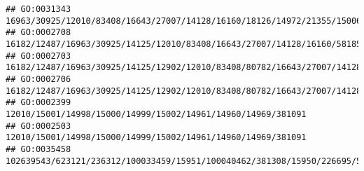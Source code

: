 \documentclass[
]{article}
\begin{document}
\begin{verbatim}
## GO:0031343                                                                                                                                                                                                                                                       16963/30925/12010/83408/16643/27007/14128/16160/18126/14972/21355/15006/15013/15015/110557/15018/68395/110558/15039/100529082/15024/667977/14990/20400
## GO:0002708                                                                                                                                                                                                                         16182/12487/16963/30925/14125/12010/83408/16643/27007/14128/16160/58185/14972/21355/15006/15013/15015/110557/15018/68395/110558/15039/100529082/15024/667977/14990/20371/20400/12229
## GO:0002703                                                                                                                                                           16182/12487/16963/30925/14125/12902/12010/83408/80782/16643/27007/14128/69550/81897/215900/16160/327957/58185/13421/14972/21354/21355/15006/15013/15015/110557/15018/68395/110558/15039/100529082/15024/667977/14990/14126/60533/20371/20400/12229
## GO:0002706                                                                                                                                                                                          16182/12487/16963/30925/14125/12902/12010/83408/80782/16643/27007/14128/215900/16160/58185/14972/21354/21355/15006/15013/15015/110557/15018/68395/110558/15039/100529082/15024/667977/14990/60533/20371/20400/12229
## GO:0002399                                                                                                                                                                                                                                                                                                                                                 12010/15001/14998/15000/14999/15002/14961/14960/14969/381091
## GO:0002503                                                                                                                                                                                                                                                                                                                                                 12010/15001/14998/15000/14999/15002/14961/14960/14969/381091
## GO:0035458                                                                                                                                                                                                                                                                          102639543/623121/236312/100033459/15951/100040462/381308/15950/226695/55932/14468/14469/23961/23960/246730/15953/240327/15959/15957

\end{verbatim}
\end{document}
